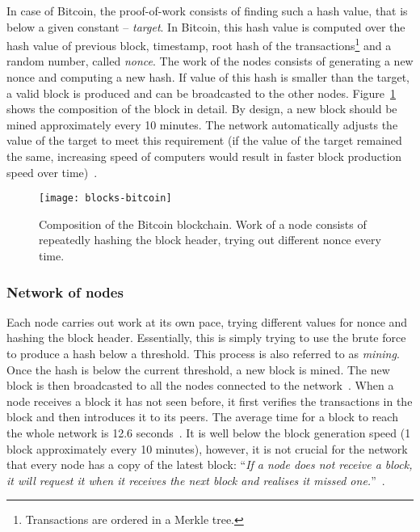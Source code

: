 In case of Bitcoin, the proof-of-work consists of finding such a hash value, that is below a given constant -- \textit{target}. In Bitcoin, this hash value is computed over the hash value of previous block, timestamp\footnotemark, root hash of the transactions\footnote{Transactions are ordered in a Merkle tree.} and a random number, called \textit{nonce}. The work of the nodes consists of generating a new nonce and computing a new hash. If value of this hash is smaller than the target, a valid block is produced and can be broadcasted to the other nodes. Figure~\ref{fig:blocks-bitcoin} shows the composition of the block in detail. By design, a new block should be mined approximately every 10 minutes. The network automatically adjusts the value of the target to meet this requirement (if the value of the target remained the same, increasing speed of computers would result in faster block production speed over time)~\cite{Decker2013InformationNetwork}.
% 
% 
\begin{figure}[ht]
    \centering
    \texttt{[image: blocks-bitcoin]}
    \caption{Composition of the Bitcoin blockchain. Work of a node consists of repeatedly hashing the block header, trying out different nonce every time.}
    \label{fig:blocks-bitcoin}
\end{figure}
% 
\subsubsection{Network of nodes}
Each node carries out work at its own pace, trying different values for nonce and hashing the block header. Essentially, this is simply trying to use the brute force to produce a hash below a threshold. This process is also referred to as \textit{mining}. Once the hash is below the current threshold, a new block is mined. The new block is then broadcasted to all the nodes connected to the network~\cite{NakamotoBitcoin:System}. When a node receives a block it has not seen before, it first verifies the transactions in the block and then introduces it to its peers. The average time for a block to reach the whole network is 12.6 seconds~\cite{Decker2013InformationNetwork}. It is well below the block generation speed (1 block approximately every 10 minutes), however, it is not crucial for the network that every node has a copy of the latest block: ``\textit{If a node does not receive a block, it will request it when it receives the next block and realises it missed one.}''~\cite{NakamotoBitcoin:System}.
% 
